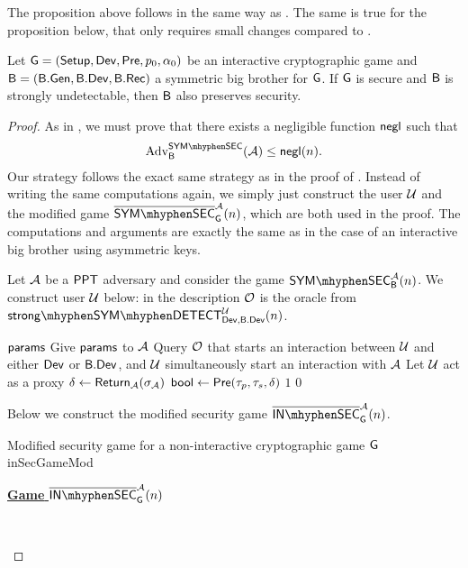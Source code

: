 The proposition above follows in the same way as . The same is true for the proposition below, that only requires small changes compared to .

\begin{prop}
Let $\operatorname{\mathsf{G}}=\left(\operatorname{\mathsf{Setup}},\operatorname{\mathsf{Dev}},\operatorname{\mathsf{Pre}},p_{0},\alpha_{0}\right)$ be an interactive cryptographic game and $\mathsf{B} = \left(\mathsf{B}.\mathsf{Gen},\mathsf{B}.\mathsf{Dev},\mathsf{B}.\mathsf{Rec}\right)$ a symmetric big brother for $\operatorname{\mathsf{G}}$. If $\operatorname{\mathsf{G}}$ is secure and $\mathsf{B}$ is strongly undetectable, then $\mathsf{B}$ also preserves security.
\end{prop}

\begin{proof}
As in , we must prove that there exists a negligible function $\operatorname{\mathsf{negl}}$ such that
\begin{align*}
	\adv_{\bb}^{\symsecgame}(\adve) \leq \negl(n).
\end{align*}
Our strategy follows the exact same strategy as in the proof of . Instead of writing the same computations again, we simply just construct the user $\user$ and the modified game $\pneg{\symsecgame}_{\cgame}^{\adve}(n)$, which are both used in the proof. The computations and arguments are exactly the same as in the case of an interactive big brother using asymmetric keys.

Let $\mathcal{A}$ be a $\mathsf{PPT}$ adversary and consider the game $\symsecgame_{\bb}^{\adve}(n)$. We construct user $\user$ below: in the description $\operatorname{\mathcal{O}}$ is the oracle from $\symstrongdetect{\dev}{\bbdev}{\user}$.

\vspace*{-.3cm}
\begin{Algorithm}[]{6cm}
\captionUser
\caption{$\user$}
\label{alg:symRedundantUser}
\begin{algorithmic}[1]
\Require $\mathsf{params}$
\State Give $\mathsf{params}$ to $\mathcal{A}$
\State Query $\operatorname{\mathcal{O}}$ that starts an interaction between $\user$ and either $\operatorname{\mathsf{Dev}}$ or $\mathsf{B}.\mathsf{Dev}$, and $\user$ simultaneously start an interaction with $\mathcal{A}$
\State Let $\user$ act as a proxy
\State $\delta \leftarrow \operatorname{\mathsf{Return}}_{\mathcal{A}}(\sigma_{\mathcal{A}})$
\State $\mathsf{bool} \leftarrow \operatorname{\mathsf{Pre}}(\tau_p,\tau_s,\delta)$
\If{$\bool = \true$}
\State \Ret $1$
\Else
\State \Ret $0$
\EndIf
\end{algorithmic}
\end{Algorithm} 

Below we construct the modified security game $\pneg{\insecgame}_{\cgame}^{\adve}(n)$.

\begin{boxfigGame}{Modified security game for a non-interactive cryptographic game $\operatorname{\mathsf{G}}$}{inSecGameMod}
  \begin{description}
	\item[\underline{\textbf{Game} $\pneg{\insecgame}_{\cgame}^{\adve}(n)$}] ~
 	

\end{description}
\end{boxfigGame}
\end{proof}
